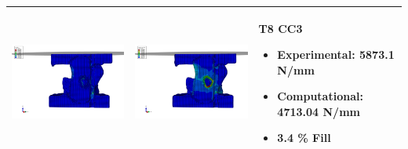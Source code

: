 \documentclass[11pt,a4paper]{article}
\begin{document}
\begin{landscape}
\begin{longtable}{|m{11cm}|m{11cm}|m{4cm}|}
\includegraphics[width=10cm]{images/T8_CC3_postVP_Interface_ABAQUS_All_Side_Stress.png}   & \includegraphics[width=10cm]{images/T8_CC3_postVP_Interface_ABAQUS_All_Side_Strain.png}   & T8 CC3  \begin{itemize} \item Experimental: 	5873.1	N/mm \item Computational:	4713.04 N/mm \item 3.4 \% Fill \end{itemize} \\ \hline 

\end{longtable}
\end{landscape}
\end{document}
